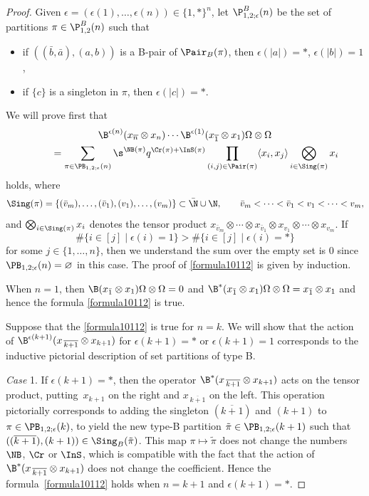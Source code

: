 \begin{proof}
Given
$\epsilon=(\epsilon(1), \dots, \epsilon(n))\in\{1,\ast\}^{n}$, let
$\P_{1,2;\epsilon}^{B}(n)$ be the set of partitions $\pi\in
\P_{1,2}^{B}(n)$ such that
\begin{itemize}\itemsep=0pt
\item if $((\bar b ,\bar a) , (a,b))$ is a B-pair of
$\Pair_B(\pi)$, then $\epsilon(|a|)= \ast$, $\epsilon(|b|)=1$,
\item if $\{c\}$ is a singleton in $\pi$, then $\epsilon( |c|)=\ast$.
\end{itemize}
We will prove first that
\begin{gather}
\B^{\epsilon(n)}(x_{\overline{n}}\otimes x_{n})\cdots \B^{\epsilon(1)}(x_{\overline{1}}\otimes x_1)\Omega \otimes \Omega \nonumber
\\
\qquad{} = \sum_{\pi\in\PB_{1,2;\epsilon}(n)} \s^{\NB(\pi)}q^{\Cr(\pi)+ \InS(\pi)}
\prod_{\substack{(i,j) \in \Pair(\pi)} }\langle x_i, x_j\rangle
\bigotimes_{i\in \Sing(\pi)} x_i\label{formula10112}
\end{gather}
holds, where
\[
\Sing(\pi) = \{(\bar v_m),\dots,(\bar v_1), (v_1),\dots,(v_m)\} \subset\bar{\N} \cup \N, \qquad
\bar v_m<\cdots < \bar v_1< v_1<\cdots < v_m,
\]
and
$\bigotimes_{i\in \Sing(\pi)} x_i$ denotes the tensor product $x_{\bar v_m}\otimes \cdots \otimes x_{\bar v_1} \otimes x_{v_1}\otimes \cdots \otimes x_{v_m}$.
If
\[
\#\{i\in[j] \mid \epsilon(i)=1\}>\#\{i\in[j] \mid \epsilon(i)=\ast\}
\]
for some $j\in\{1,\dots,n\}$, then we understand the sum over the empty set is 0 since $\PB_{1,2;\epsilon}(n)=\varnothing$ in this case.
The proof of \eqref{formula10112} is given by induction.

When $n=1$, then $\B(x_{\bar 1}\otimes x_1)\Omega\otimes \Omega=0$ and $\B^\ast(x_{\bar 1}\otimes x_1)\Omega\otimes \Omega=x_{\bar 1}\otimes x_1$ and hence the formula \eqref{formula10112} is true.

Suppose that the \eqref{formula10112} is true for $n = k$.
We will show that the action of $\B^{\epsilon(k+1)}(x_{\,\overline{k+1}}{}\otimes x_{k+1})$ for $\epsilon(k+1)=\ast$ or $\epsilon(k+1)=1$ corresponds to the inductive pictorial description of set partitions of type B.

\smallskip\noindent
\emph{Case} 1. If $\epsilon(k+1)=\ast$, then the operator $\B^\ast(x_{\,\overline{k+1}}\otimes x_{k+1})$ acts on the tensor product, putting~$x_{k+1}$ on the right and $x_{\,\overline{k+1}}$ on the left. This operation pictorially corresponds to adding the singleton $(\overline{k+1}
)$ and $(k+1)$ to $\pi\in\PB_{1,2;\epsilon}(k)$, to yield the new type-B partition $\tilde{\pi}\in\PB_{1,2;\epsilon}(k+1)$ such that $((\overline{k+1}), (k+1))\in \Sing_B(\tilde{\pi})$. This map $\pi\mapsto \tilde{\pi} $ does not change the numbers $\NB$, $\Cr$ or $\InS$, which is compatible with the fact that the action of $\B^\ast(x_{\,\overline{k+1}}\otimes x_{k+1})$ does not change the coefficient.
Hence the formula~\eqref{formula10112} holds when $n=k+1$ and $\epsilon(k+1)=\ast$.


\end{proof}
